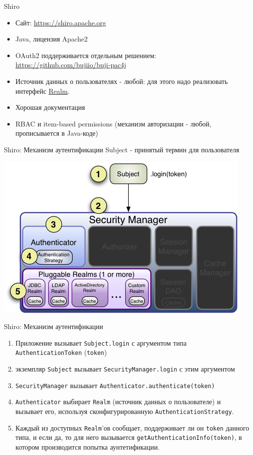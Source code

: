 \documentclass[presentation]{beamer}
\begin{document}
\begin{frame}[label={sec:orga120c36}]{Shiro}
\begin{itemize}
\item Сайт: \url{https://shiro.apache.org}
\item Java, лицензия Apache2
\item OAuth2 поддерживается отдельным решением: \url{https://github.com/bujiio/buji-pac4j}
\item Источник данных о пользователях - любой: для этого надо реализовать интерфейс \href{https://shiro.apache.org/realm.html}{Realm}.
\item Хорошая документация
\item RBAC и item-based permissions (механизм авторизации - любой, прописывается в Java-коде)
\end{itemize}
\end{frame}
\begin{frame}[label={sec:org7f5fa22}]{Shiro: Механизм аутентификации}
\alert{Subject} - принятый термин для пользователя

\begin{center}
\includegraphics[width=.9\linewidth]{./img/ShiroAuthenticationSequence.png}
\end{center}
\end{frame}

\begin{frame}[label={sec:org6038756},fragile]{Shiro: Механизм аутентификации}
 \begin{enumerate}
\item Приложение вызывает \texttt{Subject.login} с аргументом типа \texttt{AuthenticationToken} (\texttt{token})
\item экземпляр \texttt{Subject} вызывает \texttt{SecurityManager.login} с этим аргументом
\item \texttt{SecurityManager} вызывает \texttt{Authenticator.authenticate(token)}
\item \texttt{Authenticator} выбирает \texttt{Realm} (источник данных о пользователе) и вызывает его, используя сконфигурированную \texttt{AuthenticationStrategy}.
\item Каждый из доступных \texttt{Realm}'ов сообщает, поддерживает ли он \texttt{token} данного типа, и если да, то для него вызывается \texttt{getAuthenticationInfo(token)}, в котором производится попытка аунтетификации.
\end{enumerate}
\end{frame}
\end{document}
